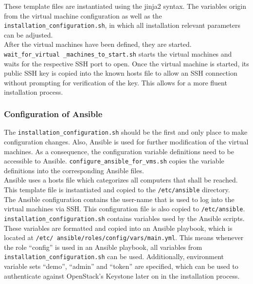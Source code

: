 \begin{appendix}
These template files are instantiated using the jinja2 syntax. The variables origin from the virtual machine configuration as well as the \texttt{installation\_configuration.sh}, in which all installation relevant parameters can be adjusted. \\

After the virtual machines have been defined, they are started. \texttt{wait\_for\_virtual \_machines\_to\_start.sh} starts the virtual machines and waits for the respective SSH port to open. Once the virtual machine is started, its public SSH key is copied into the known hosts file to allow an SSH connection without prompting for verification of the key. This allows for a more fluent installation process.


\subsubsection{Configuration of Ansible}
The \texttt{installation\_configuration.sh} should be the first and only place to make configuration changes. Also, Ansible is used for further modification of the virtual machines. As a consequence, the configuration variable definitions need to be accessible to Ansible. \texttt{configure\_ansible\_for\_vms.sh} copies the variable definitions into the corresponding Ansible files. \\

Ansible uses a hosts file which categorizes all computers that shall be reached. This template file is instantiated and copied to the \texttt{/etc/ansible} directory. \\

The Ansible configuration contains the user-name that is used to log into the virtual machines via SSH. This configuration file is also copied to \texttt{/etc/ansible}. \\

\texttt{installation\_configuration.sh} contains variables used by the Ansible scripts. These variables are formatted and copied into an Ansible playbook, which is located at \texttt{/etc/ ansible/roles/config/vars/main.yml}. This means whenever the role ``config'' is used in an Ansible playbook, all variables from \texttt{installation\_configuration.sh} can be used. Additionally, environment variable sets ``demo'', ``admin'' and ``token'' are specified, which can be used to authenticate against OpenStack's Keystone later on in the installation process. 






\end{appendix}
